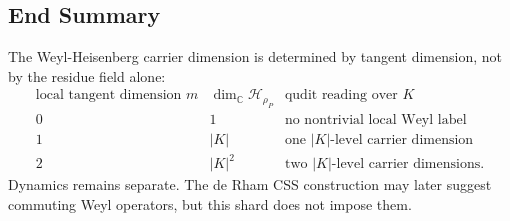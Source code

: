 \subsection{End Summary}

The Weyl-Heisenberg carrier dimension is determined by tangent dimension, not
by the residue field alone:
\[
\begin{array}{c|c|c}
\text{local tangent dimension }m & \dim_{\mathbb C}\mathcal H_{\rho_P}
  & \text{qudit reading over }K\\ \hline
0 & 1 & \text{no nontrivial local Weyl label}\\
1 & |K| & \text{one }|K|\text{-level carrier dimension}\\
2 & |K|^2 & \text{two }|K|\text{-level carrier dimensions}.
\end{array}
\]
Dynamics remains separate.  The de Rham CSS construction may later suggest
commuting Weyl operators, but this shard does not impose them.

